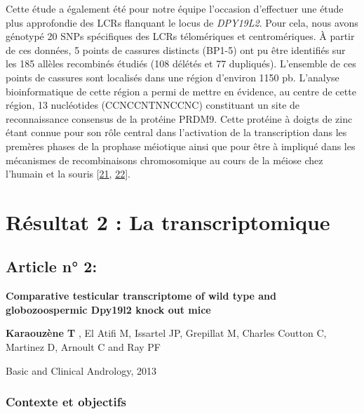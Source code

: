\documentclass[12pt,twoside]{reedthesis}
\begin{document}
  Cette étude a également été pour notre équipe l'occasion d'effectuer une
  étude plus approfondie des LCRs flanquant le locus de \emph{DPY19L2}.
  Pour cela, nous avons génotypé 20 SNPs spécifiques des LCRs télomériques
  et centromériques. À partir de ces données, 5 points de cassures
  distincts (BP1-5) ont pu être identifiés sur les 185 allèles recombinés
  étudiés (108 délétés et 77 dupliqués). L'ensemble de ces points de
  cassures sont localisés dans une région d'environ 1150 pb. L'analyse
  bioinformatique de cette région a permi de mettre en évidence, au centre
  de cette région, 13 nucléotides (CCNCCNTNNCCNC) constituant un site de
  reconnaissance consensus de la protéine PRDM9. Cette protéine à doigts
  de zinc étant connue pour son rôle central dans l'activation de la
  transcription dans les premères phases de la prophase méiotique ainsi
  que pour être à impliqué dans les mécanismes de recombinaisons
  chromosomique au cours de la méiose chez l'humain et la souris
  {[}\protect\hyperlink{ref-Parvanov2010}{21},
  \protect\hyperlink{ref-Baudat2010}{22}{]}.
  
  \newpage
  
  \section{Résultat 2 : La transcriptomique}\label{transcriptome}
  
  \subsection{Article n° 2:}\label{article-n-2}
  
  \textbf{Comparative testicular transcriptome of wild type and
  globozoospermic Dpy19l2 knock out mice}
  
  \textbf{Karaouzène T} , El Atifi M, Issartel JP, Grepillat M, Charles
  Coutton C, Martinez D, Arnoult C and Ray PF
  
  Basic and Clinical Andrology, 2013
  
  \newpage
  
  \subsubsection{Contexte et objectifs}\label{contexte-et-objectifs-1}
  
\end{document}
